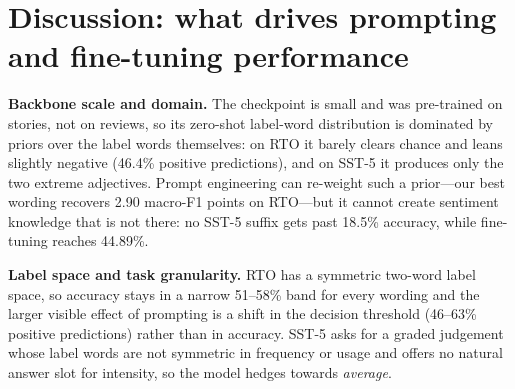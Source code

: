 \documentclass[11pt]{article}
\begin{document}
\begin{table}[!ht]
\centering
\setlength{\tabcolsep}{4pt}
\caption{Fine-tuning variants on Rotten Tomatoes (\%). Validation accuracy is in the text;
``Trainable'' is the number of parameters updated, rounded to 0.1M (exact counts in
Section~2.1). Source: \texttt{artifacts/all\_experiment\_metrics.csv}.}
\label{tab:ft}
\end{table}

\section{Discussion: what drives prompting and fine-tuning performance}

\textbf{Backbone scale and domain.} The checkpoint is small and was pre-trained on stories, not
on reviews, so its zero-shot label-word distribution is dominated by priors over the label words
themselves: on RTO it barely clears chance and leans slightly negative (46.4\% positive
predictions), and on SST-5 it produces only the two extreme adjectives. Prompt engineering can
re-weight such a prior---our best wording recovers 2.90 macro-F1 points on RTO---but it cannot
create sentiment knowledge that is not there:
no SST-5 suffix gets past 18.5\% accuracy, while fine-tuning reaches 44.89\%.

\textbf{Label space and task granularity.} RTO has a symmetric two-word label space, so accuracy
stays in a narrow 51--58\% band for every wording and the larger visible effect of prompting is a
shift in the decision threshold (46--63\% positive predictions) rather than in accuracy. SST-5 asks for a graded judgement whose label words
are not symmetric in frequency or usage and offers no natural answer slot for intensity, so the
model hedges towards \emph{average}.
\end{document}
